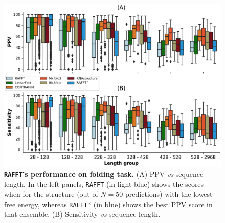\begin{figure}[t!]
	\centering
	\includegraphics[width=1.\linewidth]{../res/images/rafft/accuracy.pdf}
	\caption{\label{perf_fig} \textbf{\texttt{RAFFT}'s performance on folding task.} (A) PPV \emph{vs} sequence length. In the left panels, \texttt{RAFFT} (in light blue) shows the scores when for the structure (out of $N=50$ predictions) with the lowest free energy, whereas \texttt{RAFFT}* (in blue) shows the best PPV score in that ensemble. (B) Sensitivity \emph{vs} sequence length.}
\end{figure}


